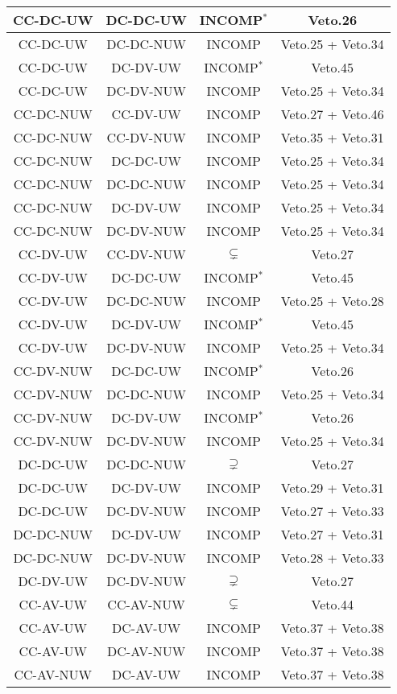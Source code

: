 \begin{longtable}{|c|c|c|c|}
\hline
CC-DC-UW&DC-DC-UW&INCOMP${}^*$&Veto.26\\
\hline
CC-DC-UW&DC-DC-NUW&INCOMP&Veto.25 + Veto.34\\
\hline
CC-DC-UW&DC-DV-UW&INCOMP${}^*$&Veto.45\\
\hline
CC-DC-UW&DC-DV-NUW&INCOMP&Veto.25 + Veto.34\\
\hline
CC-DC-NUW&CC-DV-UW&INCOMP&Veto.27 + Veto.46\\
\hline
CC-DC-NUW&CC-DV-NUW&INCOMP&Veto.35 + Veto.31\\
\hline
CC-DC-NUW&DC-DC-UW&INCOMP&Veto.25 + Veto.34\\
\hline
CC-DC-NUW&DC-DC-NUW&INCOMP&Veto.25 + Veto.34\\
\hline
CC-DC-NUW&DC-DV-UW&INCOMP&Veto.25 + Veto.34\\
\hline
CC-DC-NUW&DC-DV-NUW&INCOMP&Veto.25 + Veto.34\\
\hline
CC-DV-UW&CC-DV-NUW&$\subsetneq$&Veto.27\\
\hline
CC-DV-UW&DC-DC-UW&INCOMP${}^*$&Veto.45\\
\hline
CC-DV-UW&DC-DC-NUW&INCOMP&Veto.25 + Veto.28\\
\hline
CC-DV-UW&DC-DV-UW&INCOMP${}^*$&Veto.45\\
\hline
CC-DV-UW&DC-DV-NUW&INCOMP&Veto.25 + Veto.34\\
\hline
CC-DV-NUW&DC-DC-UW&INCOMP${}^*$&Veto.26\\
\hline
CC-DV-NUW&DC-DC-NUW&INCOMP&Veto.25 + Veto.34\\
\hline
CC-DV-NUW&DC-DV-UW&INCOMP${}^*$&Veto.26\\
\hline
CC-DV-NUW&DC-DV-NUW&INCOMP&Veto.25 + Veto.34\\
\hline
DC-DC-UW&DC-DC-NUW&$\supsetneq$&Veto.27\\
\hline
DC-DC-UW&DC-DV-UW&INCOMP&Veto.29 + Veto.31\\
\hline
DC-DC-UW&DC-DV-NUW&INCOMP&Veto.27 + Veto.33\\
\hline
DC-DC-NUW&DC-DV-UW&INCOMP&Veto.27 + Veto.31\\
\hline
DC-DC-NUW&DC-DV-NUW&INCOMP&Veto.28 + Veto.33\\
\hline
DC-DV-UW&DC-DV-NUW&$\supsetneq$&Veto.27\\
\hline
CC-AV-UW&CC-AV-NUW&$\subsetneq$&Veto.44\\
\hline
CC-AV-UW&DC-AV-UW&INCOMP&Veto.37 + Veto.38\\
\hline
CC-AV-UW&DC-AV-NUW&INCOMP&Veto.37 + Veto.38\\
\hline
CC-AV-NUW&DC-AV-UW&INCOMP&Veto.37 + Veto.38\\

\end{longtable}
